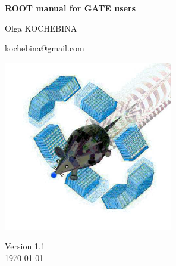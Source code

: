 \begin{titlepage}
\vspace*{1cm}
{\boldmath\huge
\begin{center}
\textbf{ROOT manual for GATE users}
\end{center}
}

\vspace*{1cm}
\begin{center}
Olga KOCHEBINA
\end{center}
\begin{center}
kochebina@gmail.com
\end{center}

\begin{center}
\includegraphics[width=.5\textwidth]{figs/gate_logo.png}
\end{center}

\vspace*{1cm}
\begin{center}
Version 1.1\\
\vspace*{0.5cm}
\today
\end{center}

\vspace*{5.0cm}

\vspace{\fill}



\vspace*{1.5cm}
\vspace{\fill}
\endgroup
\end{titlepage}


\pagestyle{empty}  %


\newpage
\setcounter{page}{2}

